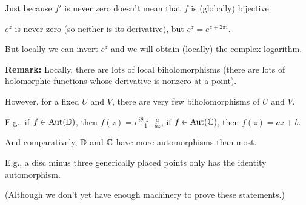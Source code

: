 \documentclass[10pt,aspectratio=169]{beamer}
\begin{document}
\begin{frame}
Just because $f'$ is never zero doesn't mean that 
$f$ is (globally) bijective.

\medskip
\pause

$e^z$ is never zero (so neither is its derivative),
but $e^{z} = e^{z+2\pi i}$.

\medskip
\pause

But locally we can invert $e^z$ and we will obtain
(locally) the complex logarithm.

\medskip
\pause

\textbf{Remark:}
Locally, there are lots of local biholomorphisms
(there are lots of holomorphic functions whose derivative is nonzero at a point).

\medskip
\pause

However, for a fixed $U$ and $V$, there are very few biholomorphisms of $U$
and $V$.

\medskip
\pause

E.g., if $f \in \operatorname{Aut}({\mathbb{D}})$, then $f(z) = e^{i\theta} \frac{z-a}{1-\bar{a}z}$,
\pause
if $f \in \operatorname{Aut}({\mathbb{C}})$, then $f(z) = a z + b$.

\medskip
\pause

And comparatively, ${\mathbb{D}}$ and ${\mathbb{C}}$ have more automorphisms
than most. 

\medskip
\pause

E.g., a disc minus three generically placed points only has the identity 
automorphism.

\medskip
\pause

(Although we don't yet have enough machinery to prove these statements.)
\end{frame}
\end{document}
